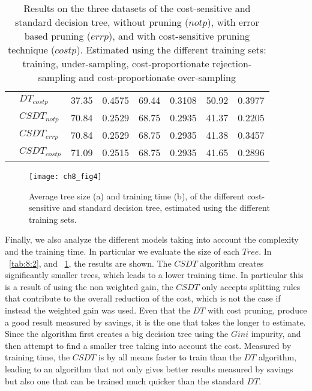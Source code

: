 \begin{table}
\begin{tabular}{|c|l|c c|c c |c c|}
    &$DT_{cost p}$& 37.35&0.4575&69.44&0.3108&50.92&0.3977\\
    &$CSDT_{not p}$&  70.84&0.2529&68.75&0.2935&41.37&0.2205\\
    &$CSDT_{err p}$&  70.84&0.2529&68.75&0.2935&41.38&0.3457\\
    &$CSDT_{cost p}$& 71.09&0.2515&68.75&0.2935&41.65&0.2896\\
    \hline
  \end{tabular} 
    \caption{Results on the three datasets of the cost-sensitive and standard decision tree,    
  without pruning ($not p$), with error based pruning ($err p$), and with cost-sensitive pruning 
  technique ($cost p$). Estimated using the different training sets: training, under-sampling, 
  cost-proportionate rejection-sampling and cost-proportionate over-sampling}
  \label{tab:8:1}
\end{table}


 
\begin{figure}
  \centering
  \texttt{[image: ch8\_fig4]}
  \caption{Average tree size (a) and training time (b), of the different cost-sensitive and 
  standard decision tree, estimated using the different training sets.}
  \label{fig:8:4}
\end{figure}
  
Finally, we also analyze the different models taking into account the complexity and the 
training time. In particular we evaluate the size of each $Tree$. In \tablename{~\ref{tab:8:2}}, 
and \figurename{~\ref{fig:8:4}}, the results are shown. The $CSDT$ algorithm creates significantly 
smaller trees, which leads to a lower training time. In particular this is a result of using the 
non weighted gain, the $CSDT$ only accepts splitting rules that contribute to the overall reduction 
of the cost, which is not the case if instead the weighted gain was used. Even that the $DT$ 
with cost pruning, produce a good result measured by savings, it is the one that takes the 
longer to estimate. Since the algorithm first creates a big decision tree using the $Gini$ 
impurity, and then attempt to find a smaller tree taking into account the cost. Measured by 
training time, the $CSDT$ is by all means faster to train than the $DT$ algorithm, leading to 
an algorithm that not only gives better results measured by savings but also one that can be 
trained much quicker than the standard $DT$.

